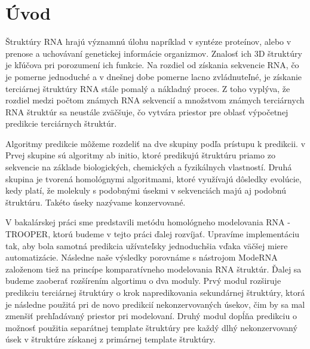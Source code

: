 \chapter*{Úvod}

Štruktúry RNA hrajú významnú úlohu napríklad v syntéze proteínov, alebo v prenose a uchovávaní genetickej informácie organizmov. Znalosť ich 3D štruktúry je kľúčova pri porozumení ich funkcie. Na rozdiel od získania sekvencie RNA, čo je pomerne jednoduché a v dnešnej dobe pomerne lacno zvládnuteľné, je získanie terciárnej štruktúry RNA stále pomalý a nákladný proces. Z toho vyplýva, že  rozdiel medzi počtom známych RNA sekvencií a množstvom známych terciárnych RNA štruktúr sa neustále zväčšuje, čo vytvára priestor pre oblasť výpočetnej predikcie terciárnych štruktúr.


\indent Algoritmy predikcie môžeme rozdeliť na dve skupiny podľa prístupu k predikcii. v Prvej skupine sú algoritmy ab initio, ktoré predikujú štruktúru priamo zo sekvencie na základe biologických, chemických a fyzikálnych vlastností. Druhá skupina je tvorená homológnymi algoritmami, ktoré využívajú dôsledky evolúcie, kedy platí, že molekuly s podobnými úsekmi v sekvenciách majú aj podobnú štruktúru. Takéto úseky nazývame konzervované. 


\indent V bakalárskej práci sme predstavili metódu homológneho modelovania RNA - TROOPER, ktorú budeme v tejto práci ďalej rozvíjať. Upravíme implementáciu tak, aby bola samotná predikcia užívateľsky jednoduchšia vďaka väčšej miere automatizácie. Následne naše výsledky porovnáme s nástrojom ModeRNA založenom tiež na princípe komparatívneho modelovania RNA štruktúr.
Ďalej sa budeme zaoberať rozšírením algortimu o dva moduly. Prvý modul rozširuje predikciu terciárnej štruktúry o krok napredikovania sekundárnej štruktúry, ktorá je následne použitá pri de novo predikcií nekonzervovaných úsekov, čim by sa mal zmenšiť prehľadávaný priestor pri modelovaní. Druhý modul dopĺňa predikciu o možnosť použitia separátnej template štruktúry pre každý dlhý nekonzervovaný úsek v štruktúre získanej z primárnej template štruktúry.